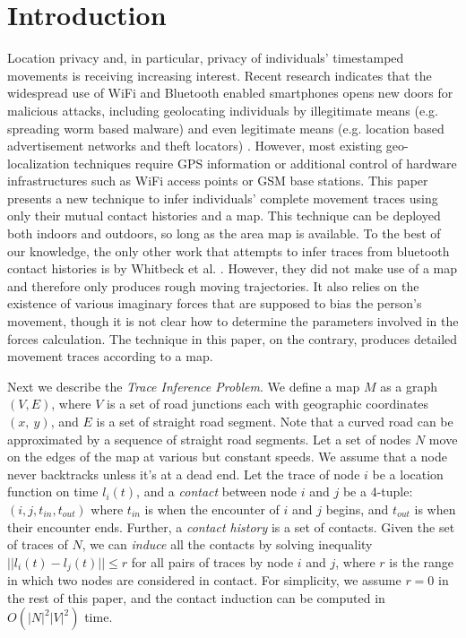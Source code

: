 
\section{Introduction}
\label{sec:intro}

Location privacy and, in particular, privacy of 
individuals' timestamped movements 
is receiving increasing interest. 
Recent research indicates that the widespread use of WiFi and Bluetooth
enabled smartphones opens new doors for malicious attacks, 
including geolocating individuals by illegitimate means 
(e.g. spreading worm based malware) and even legitimate means 
(e.g. location based advertisement networks and theft locators) 
\cite{Ma10:PrivacyTraces,HustedM10:Malnets,Constandache10:SeeBob}. 
However, most existing geo-localization techniques require GPS 
information or additional control of hardware infrastructures such 
as WiFi access points or GSM base stations.  
This paper presents a new technique to infer individuals' 
complete movement traces using only their mutual contact histories and a map. 
This technique can be deployed both indoors and outdoors, 
so long as the area map is available. To the best of our knowledge, 
the only other work that attempts to infer traces from 
bluetooth contact histories is by Whitbeck et al. \cite{Whitbeck10:Plausible}.
However, they did not make use of a map and therefore only produces rough
moving trajectories. It also relies on the existence of various imaginary
forces that are supposed to bias the person's movement, though it is not
clear how to determine the parameters involved in the
forces calculation. The technique in this paper, on the contrary, produces
detailed movement traces according to a map.

Next we describe the {\em Trace Inference Problem}.
We define a map $M$ as a graph $(V,E)$, where $V$ is a
set of road junctions each with geographic coordinates $(x,~ y)$,
and $E$ is a set of straight road segment. Note that a curved road
can be approximated by a sequence of straight road segments.
Let a set of nodes $N$ move on the edges of the map at various
but constant speeds.
We assume that a node never backtracks unless it's at a dead end.
Let the trace of node $i$ be a location function on time $l_i(t)$,
and a {\em contact} between node $i$ and $j$ be a 4-tuple:
$(i, j, t_{in}, t_{out})$
where $t_{in}$ is when the encounter of $i$ and $j$ begins, and $t_{out}$ is
when their encounter ends. Further, a {\em contact history} is a set of contacts.
Given the set of traces of $N$, we can {\em induce} all the contacts by solving
inequality $||l_i(t)-l_j(t)|| \leq r$
for all pairs of traces by node $i$ and $j$, where $r$ is the range
in which two nodes are considered in contact.
For simplicity, we assume $r = 0$ in the rest of this paper, and
the contact induction can be computed in $O(|N|^2|V|^2)$ time.

